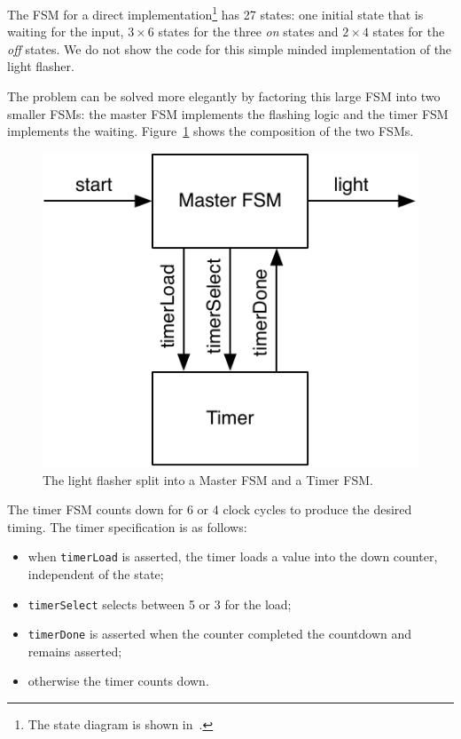 \documentclass[%
    10pt,
    headinclude, footexclude,
    openright, %
    notitlepage,
    cleardoubleempty,
    headsepline,
    pointlessnumbers,
    bibtotoc, idxtotoc,
    ]{scrbook}
\newcommand{\code}[1]{{\small{\texttt{#1}}}}
\newcommand{\scale}{0.7}
\begin{document}
The FSM for a direct implementation\footnote{The state diagram is shown
in~\cite[p.~376]{dally:vhdl:2016}.} has 27 states:
one initial state that is waiting for the input, $3 \times 6$ states for the three
\emph{on} states and $2 \times 4$ states for the \emph{off} states.
We do not show the code for this simple minded implementation of the light
flasher.

The problem can be solved more elegantly by factoring this large FSM into
two smaller FSMs: the master FSM implements the flashing logic and the timer FSM
implements the waiting. Figure~\ref{fig:flasher} shows the composition of
the two FSMs.

\begin{figure}
  \centering
  \includegraphics[scale=\scale]{figures/flasher}
  \caption{The light flasher split into a Master FSM and a Timer FSM.}
  \label{fig:flasher}
\end{figure}

The timer FSM counts down for 6 or 4 clock cycles to produce the desired timing.
The timer specification is as follows:

\begin{itemize}
\item when \code{timerLoad} is asserted, the timer loads a value into the down counter,
independent of the state;
\item \code{timerSelect} selects between 5 or 3 for the load;
\item \code{timerDone} is asserted when the counter completed the countdown
and remains asserted;
\item otherwise the timer counts down.
\end{itemize}
\end{document}
